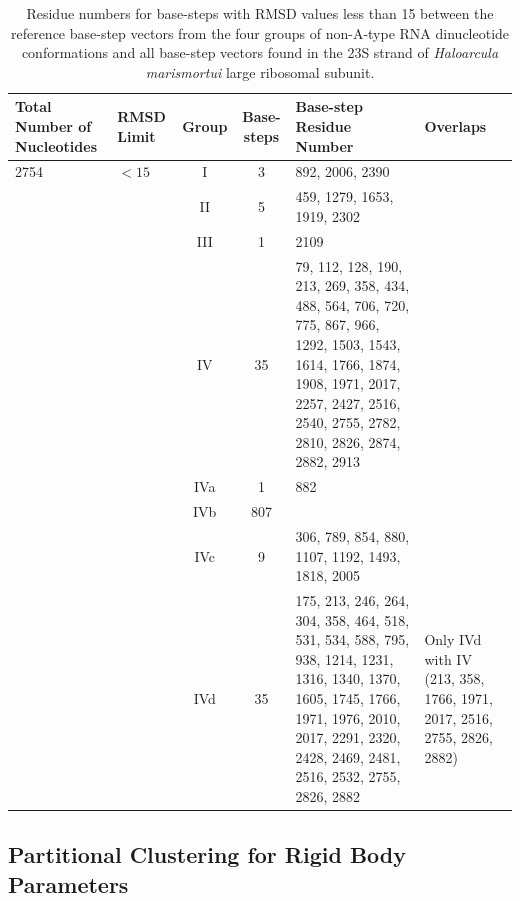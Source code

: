 \begin{table}[htbp]
\begin{center}
{\footnotesize
\begin{tabular}{p{3cm}|p{}|c|c|p{3cm}|p{3cm}}
\hline
\bf{Total Number of Nucleotides} & \bf{RMSD Limit} & \bf{Group} & \bf{Base-steps}
& \bf{Base-step Residue Number} & \bf{Overlaps} \\ \hline
2754 & $ < 15$ & I & 3 & 892, 2006, 2390 &  \\ \hline
 &  & II & 5 & 459, 1279, 1653, 1919, 2302 &  \\ \hline
 &  & III & 1 & 2109 &  \\ \hline
 &  & IV & 35 & 79, 112, 128, 190, 213, 269, 358, 434, 488, 564, 706,
 720, 775, 867, 966, 1292, 1503, 1543, 1614, 1766, 1874, 1908, 1971, 
 2017, 2257, 2427, 2516, 2540, 2755, 2782, 2810, 2826, 2874, 2882, 2913 &  \\ \hline
 &  & IVa & 1 & 882 &  \\ \hline
 &  & IVb & 807 &  &  \\ \hline
 &  & IVc & 9 & 306, 789, 854, 880, 1107, 1192, 1493, 1818, 2005 &  \\ \hline
 &  & IVd & 35 & 175, 213, 246, 264, 304, 358, 464, 518, 531, 534,
 588, 795, 938, 1214, 1231, 1316, 1340, 1370, 1605, 1745, 1766, 
 1971, 1976, 2010, 2017, 2291, 2320, 2428, 2469, 2481, 2516, 2532, 
 2755, 2826, 2882 & Only IVd with IV (213, 358, 1766, 1971, 2017, 
 2516, 2755, 2826, 2882) \\ \hline
\end{tabular}
}
\caption{Residue numbers for base-steps  with RMSD values less than 15
between  the  reference base-step  vectors  from  the  four groups  of
non-A-type  RNA dinucleotide conformations  and all  base-step vectors
found  in  the 23S  strand  of  \textit{Haloarcula marismortui}  large
ribosomal subunit.}
\label{tab:nonA}
\end{center}
\end{table}


\subsection{Partitional Clustering for Rigid Body Parameters}

